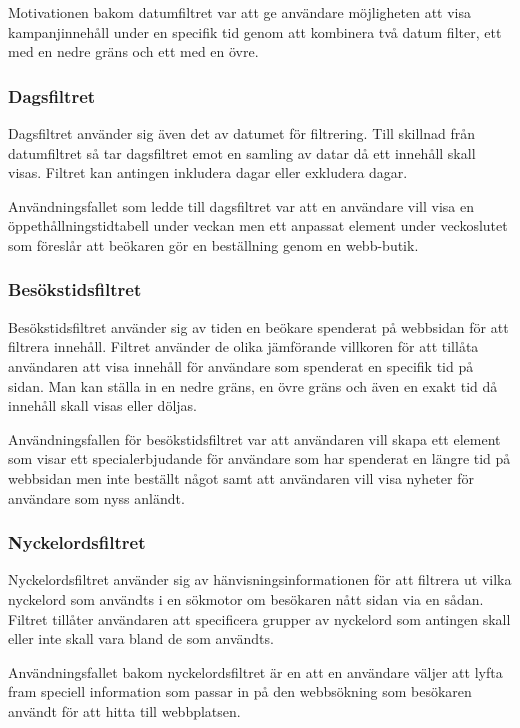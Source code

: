Motivationen bakom datumfiltret var att ge användare möjligheten att visa kampanjinnehåll under en specifik tid genom att kombinera två datum filter, ett med en nedre gräns och ett med en övre.

\subsubsection{Dagsfiltret}

Dagsfiltret använder sig även det av datumet för filtrering. Till skillnad från datumfiltret så tar dagsfiltret emot en samling av datar då ett innehåll skall visas. Filtret kan antingen inkludera dagar eller exkludera dagar.

Användningsfallet som ledde till dagsfiltret var att en användare vill visa en öppethållningstidtabell under veckan men ett anpassat element under veckoslutet som föreslår att beökaren gör en beställning genom en webb-butik.

\subsubsection{Besökstidsfiltret}

Besökstidsfiltret använder sig av tiden en beökare spenderat på webbsidan för att filtrera innehåll. Filtret använder de olika jämförande villkoren för att tillåta användaren att visa innehåll för användare som spenderat en specifik tid på sidan. Man kan ställa in en nedre gräns, en övre gräns och även en exakt tid då innehåll skall visas eller döljas.

Användningsfallen för besökstidsfiltret var att användaren vill skapa ett element som visar ett specialerbjudande för användare som har spenderat en längre tid på webbsidan men inte beställt något samt att användaren vill visa nyheter för användare som nyss anländt.

\subsubsection{Nyckelordsfiltret}

Nyckelordsfiltret använder sig av hänvisningsinformationen för att filtrera ut vilka nyckelord som användts i en sökmotor om besökaren nått sidan via en sådan. Filtret tillåter användaren att specificera grupper av nyckelord som antingen skall eller inte skall vara bland de som användts.

Användningsfallet bakom nyckelordsfiltret är en att en användare väljer att lyfta fram speciell information som passar in på den webbsökning som besökaren användt för att hitta till webbplatsen.


